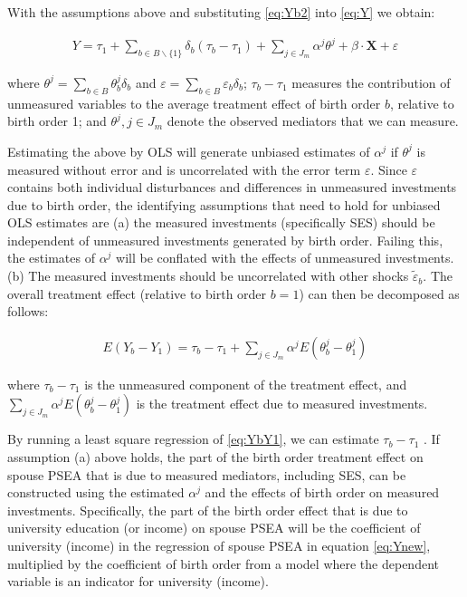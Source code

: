\documentclass[
]{article}
\begin{document}
With the assumptions above and substituting \eqref{eq:Yb2} into
\eqref{eq:Y} we obtain:

\begin{align}
\label{eq:Ynew}
Y = \tau_1+\sum_{b \in B\backslash\{1\}} \delta_b(\tau_b-\tau_1) + \sum_{j \in J_m} \alpha^j \theta^j  +   \beta \cdot \mathbf{X} + \varepsilon
\end{align}

where \(\theta^j = \sum_{b \in B}\theta^j_b\delta_b\) and
\(\varepsilon = \sum_{b \in B}\varepsilon_b\delta_b\); \(\tau_b-\tau_1\)
measures the contribution of unmeasured variables to the average
treatment effect of birth order \(b\), relative to birth order 1; and
\(\theta^j, j \in J_m\) denote the observed mediators that we can measure.

Estimating the above by OLS will generate unbiased estimates of
\(\alpha^j\) if \(\theta^j\) is measured without error and is uncorrelated
with the error term \(\varepsilon\). Since \(\varepsilon\) contains both
individual disturbances and differences in unmeasured investments due to
birth order, the identifying assumptions that need to hold for unbiased
OLS estimates are (a) the measured investments (specifically SES) should
be independent of unmeasured investments generated by birth order.
Failing this, the estimates of \(\alpha^j\) will be conflated with the
effects of unmeasured investments. (b) The measured investments should
be uncorrelated with other shocks \(\tilde{\varepsilon}_b\). The overall
treatment effect (relative to birth order \(b = 1\)) can then be
decomposed as follows:

\begin{align}
\label{eq:YbY1}
E(Y_b - Y_1) = \tau_b - \tau_1 + \sum_{j \in J_m} \alpha^j E(\theta^j_b - \theta^j_1)
\end{align}

where \(\tau_b - \tau_1\) is the unmeasured component of the treatment
effect, and \(\sum_{j \in J_m} \alpha^j E(\theta^j_b - \theta^j_1)\) is
the treatment effect due to measured investments.

By running a least square regression of \eqref{eq:YbY1}, we can estimate
\(\tau_b - \tau_1\) . If assumption (a) above holds, the part of the birth
order treatment effect on spouse PSEA that is due to measured mediators,
including SES, can be constructed using the estimated \(\alpha^j\) and the
effects of birth order on measured investments. Specifically, the part
of the birth order effect that is due to university education (or
income) on spouse PSEA will be the coefficient of university (income) in
the regression of spouse PSEA in equation \eqref{eq:Ynew}, multiplied by
the coefficient of birth order from a model where the dependent variable
is an indicator for university (income).
\end{document}
